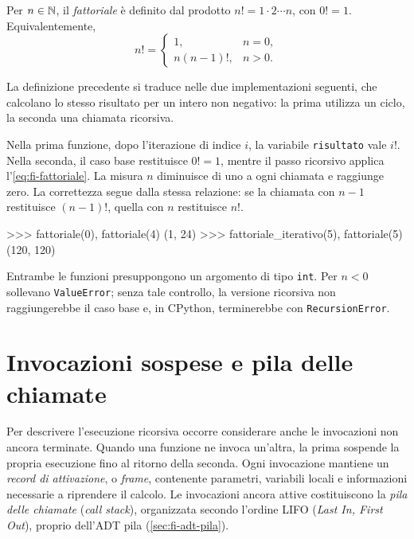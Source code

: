 Per \(n\in\mathbb{N}\), il \emph{fattoriale} è definito dal prodotto
\(n!=1\cdot2\cdots n\), con \(0!=1\). Equivalentemente,
\begin{equation}
  n!=\begin{cases}
    1, & n=0,\\
    n(n-1)!, & n>0.
  \end{cases}
  \label{eq:fi-fattoriale}
\end{equation}

La definizione precedente si traduce nelle due implementazioni
seguenti, che calcolano lo stesso risultato per un intero non negativo:
la prima utilizza un ciclo, la seconda una chiamata ricorsiva.



Nella prima funzione, dopo l'iterazione di indice \(i\), la variabile
\texttt{risultato} vale \(i!\). Nella seconda, il caso base restituisce
\(0!=1\), mentre il passo ricorsivo applica l'\cref{eq:fi-fattoriale}.
La misura \(n\) diminuisce di uno a ogni chiamata e raggiunge zero.
La correttezza segue dalla stessa relazione: se la chiamata con \(n-1\)
restituisce \((n-1)!\), quella con \(n\) restituisce \(n!\).

\begin{unipdterminal}
>>> fattoriale(0), fattoriale(4)
(1, 24)
>>> fattoriale_iterativo(5), fattoriale(5)
(120, 120)
\end{unipdterminal}

Entrambe le funzioni presuppongono un argomento di tipo \texttt{int}.
Per \(n<0\) sollevano \texttt{ValueError}; senza tale controllo,
la versione ricorsiva non raggiungerebbe il caso base e, in CPython,
terminerebbe con \texttt{RecursionError}.

\section{Invocazioni sospese e pila delle chiamate}
\label{sec:fi-pila-ricorsione}

Per descrivere l'esecuzione ricorsiva occorre considerare anche le
invocazioni non ancora terminate. Quando una funzione ne invoca un'altra,
la prima sospende la propria esecuzione fino al ritorno della seconda.
Ogni invocazione mantiene un
\emph{record di attivazione}, o \emph{frame}, contenente parametri,
variabili locali e informazioni necessarie a riprendere il calcolo.
Le invocazioni ancora attive costituiscono la \emph{pila delle chiamate}
(\emph{call stack}), organizzata secondo l'ordine LIFO
(\emph{Last In, First Out}), proprio dell'ADT pila (\cref{sec:fi-adt-pila}).

